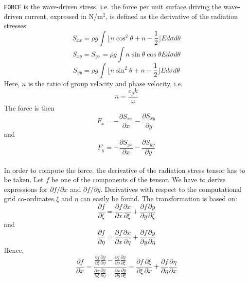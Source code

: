 \documentclass[12pt]{book}
\begin{document}
{\tt FORCE} is the wave-driven stress, i.e. the force per unit surface driving the wave-driven current, expressed in N/m$^2$, is defined
as the derivative of the radiation stresses:
\begin{equation}
  S_{xx} = \rho g \int \lfloor n \cos^2\theta + n - \frac{1}{2} \rfloor E d\sigma d\theta
\end{equation}
\begin{equation}
  S_{xy} = S_{yx} = \rho g \int n \sin\theta \cos\theta E d\sigma d\theta
\end{equation}
\begin{equation}
  S_{yy} = \rho g \int \lfloor n \sin^2\theta + n - \frac{1}{2} \rfloor E d\sigma d\theta
\end{equation}
Here, $n$ is the ratio of group velocity and phase velocity, i.e.
\begin{equation}
  n = \frac{c_g k}{\omega}
\end{equation}
The force is then
\begin{equation}
  F_x = -\frac{\partial S_{xx}}{\partial x} - \frac{\partial S_{xy}}{\partial y}
\end{equation}
and
\begin{equation}
  F_y = -\frac{\partial S_{yx}}{\partial x} - \frac{\partial S_{yy}}{\partial y}
\end{equation}
\\[2ex]
\noindent
In order to compute the force, the derivative of the radiation stress tensor has to be taken.
Let $f$ be one of the components of the tensor. We have to derive expressions for $\partial f/\partial x$ and
$\partial f/\partial y$. Derivatives with respect to the computational grid co-ordinates $\xi$ and $\eta$
can easily be found. The transformation is based on:
\begin{equation}
  \frac{\partial f}{\partial \xi} = \frac{\partial f}{\partial x}\frac{\partial x}{\partial \xi} +
                                    \frac{\partial f}{\partial y}\frac{\partial y}{\partial \xi}
\end{equation}
and
\begin{equation}
  \frac{\partial f}{\partial \eta} = \frac{\partial f}{\partial x}\frac{\partial x}{\partial \eta} +
                                    \frac{\partial f}{\partial y}\frac{\partial y}{\partial \eta}
\end{equation}
Hence,
\begin{equation}
  \frac{\partial f}{\partial x} = \frac{\frac{\partial f}{\partial\xi}\frac{\partial y}{\partial\eta}-\frac{\partial f}{\partial\eta}\frac{\partial y}{\partial\xi}}
                                       {\frac{\partial x}{\partial\xi}\frac{\partial y}{\partial\eta}-\frac{\partial x}{\partial\eta}\frac{\partial y}{\partial\xi}} =
  \frac{\partial f}{\partial \xi}\frac{\partial \xi}{\partial x} + \frac{\partial f}{\partial \eta}\frac{\partial \eta}{\partial x}
\end{equation}
\end{document}
